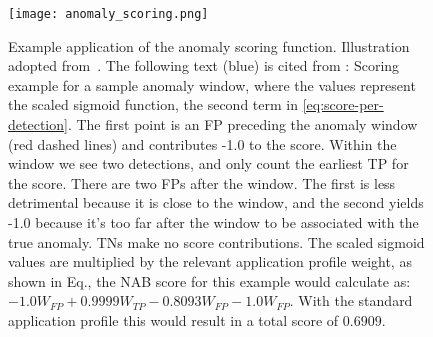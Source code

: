 \begin{figure}[htp!]
    \centering
    \texttt{[image: anomaly\_scoring.png]}
    \caption[Example of anomaly scoring function]{Example application of the anomaly
    scoring function. Illustration adopted from~\cite{Lavin.2015}. The following
    text (blue) is cited from \textcite{Lavin.2015}:
    {\color{blue}
    Scoring example for a sample anomaly window, where the values
    represent the scaled sigmoid function, the second term in \cref{eq:score-per-detection}.
    The first point is an FP preceding the anomaly window (red dashed lines) and
    contributes -1.0 to the score. Within the window we see two detections, and
    only count the earliest TP for the score. There are two FPs after the window.
    The first is less detrimental because it is close to the window, and the second
    yields -1.0 because it’s too far after the window to be associated with the true
    anomaly. TNs make no score contributions. The scaled sigmoid values are
    multiplied by the relevant application profile weight, as shown in Eq.,
    the NAB score for this example would calculate as: 
    \(-1.0W_{FP} + 0.9999W_{TP} - 0.8093W_{FP} - 1.0W_{FP}\).
    With the standard application profile this would result in a total score of
    \(0.6909\).}
    }\label{fig:anomaly-score-example}
\end{figure}\clearpage

